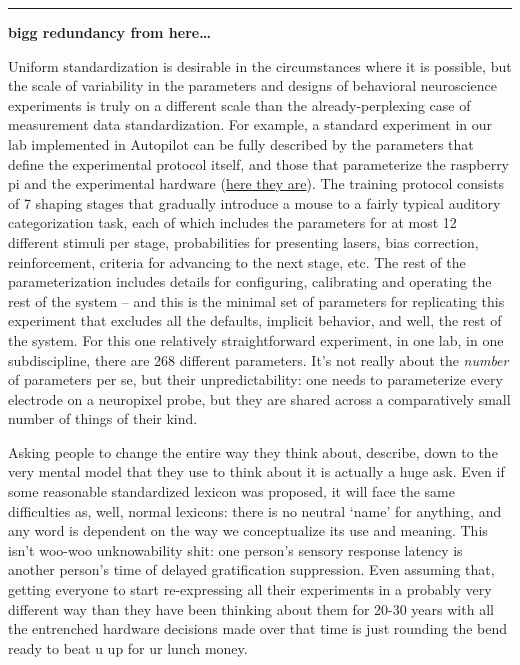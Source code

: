 \documentclass[11pt]{article}
\begin{document}
\begin{multicols}{2}
\begin{center}\rule{0.5\linewidth}{0.5pt}\end{center}

\textbf{bigg redundancy from here\ldots{}}

Uniform standardization is desirable in the circumstances where it is
possible, but the scale of variability in the parameters and designs of
behavioral neuroscience experiments is truly on a different scale than
the already-perplexing case of measurement data standardization. For
example, a standard experiment in our lab implemented in Autopilot can
be fully described by the parameters that define the experimental
protocol itself, and those that parameterize the raspberry pi and the
experimental hardware
(\href{https://gist.github.com/sneakers-the-rat/eebe675326a157df49f66f62c4e33a6e}{here
they are}). The training protocol consists of 7 shaping stages that
gradually introduce a mouse to a fairly typical auditory categorization
task, each of which includes the parameters for at most 12 different
stimuli per stage, probabilities for presenting lasers, bias correction,
reinforcement, criteria for advancing to the next stage, etc. The rest
of the parameterization includes details for configuring, calibrating
and operating the rest of the system -- and this is the minimal set of
parameters for replicating this experiment that excludes all the
defaults, implicit behavior, and well, the rest of the system. For this
one relatively straightforward experiment, in one lab, in one
subdiscipline, there are 268 different parameters. It's not really about
the \emph{number} of parameters per se, but their unpredictability: one
needs to parameterize every electrode on a neuropixel probe, but they
are shared across a comparatively small number of things of their kind.

Asking people to change the entire way they think about, describe, down
to the very mental model that they use to think about it is actually a
huge ask. Even if some reasonable standardized lexicon was proposed, it
will face the same difficulties as, well, normal lexicons: there is no
neutral `name' for anything, and any word is dependent on the way we
conceptualize its use and meaning. This isn't woo-woo unknowability
shit: one person's sensory response latency is another person's time of
delayed gratification suppression. Even assuming that, getting everyone
to start re-expressing all their experiments in a probably very
different way than they have been thinking about them for 20-30 years
with all the entrenched hardware decisions made over that time is just
rounding the bend ready to beat u up for ur lunch money.


\end{multicols}
\end{document}
